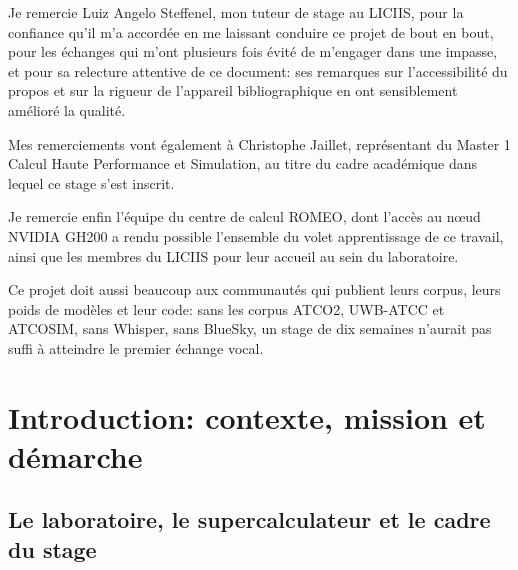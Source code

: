 \documentclass[11pt,a4paper]{article}
\begin{document}
Je remercie Luiz Angelo Steffenel, mon tuteur de stage au LICIIS, pour la confiance qu'il
m'a accordée en me laissant conduire ce projet de bout en bout, pour les échanges qui m'ont
plusieurs fois évité de m'engager dans une impasse, et pour sa relecture attentive de ce
document: ses remarques sur l'accessibilité du propos et sur la rigueur de l'appareil
bibliographique en ont sensiblement amélioré la qualité.

Mes remerciements vont également à Christophe Jaillet, représentant du Master 1 Calcul Haute
Performance et Simulation, au titre du cadre académique dans lequel ce stage s'est inscrit.

Je remercie enfin l'équipe du centre de calcul ROMEO, dont l'accès au n\oe ud NVIDIA GH200
a rendu possible l'ensemble du volet apprentissage de ce travail, ainsi que les membres du
LICIIS pour leur accueil au sein du laboratoire.

Ce projet doit aussi beaucoup aux communautés qui publient leurs corpus, leurs poids de
modèles et leur code: sans les corpus ATCO2, UWB-ATCC et ATCOSIM, sans Whisper, sans
BlueSky, un stage de dix semaines n'aurait pas suffi à atteindre le premier échange vocal.

\clearpage

\tableofcontents
\thispagestyle{fancy}
\clearpage

\listoffigures
{}
\thispagestyle{fancy}
\clearpage

\listoftables
{}
\thispagestyle{fancy}
\clearpage
\section{Introduction: contexte, mission et démarche}

\subsection{Le laboratoire, le supercalculateur et le cadre du stage}
\end{document}
